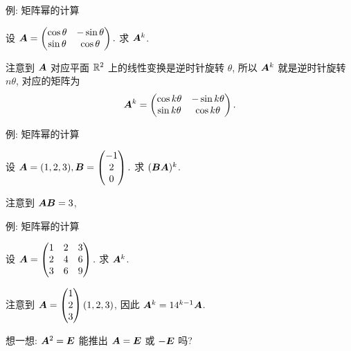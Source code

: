 \begin{frame}{例: 矩阵幂的计算}
	\onslide<+->
	\begin{example}
		设
		${\boldsymbol{A}}=\begin{pmatrix}
			\cos\theta&-\sin\theta\\
			\sin\theta&\cos\theta
		\end{pmatrix}.$
		求 ${\boldsymbol{A}}^k$.
	\end{example}
	\onslide<+->
	\begin{solution}
		注意到 ${\boldsymbol{A}}$ 对应平面 ${\mathbb{R}}^2$ 上的线性变换是逆时针旋转 $\theta$, 所以 ${\boldsymbol{A}}^k$ 就是逆时针旋转 $n\theta$, 对应的矩阵为
		\[{\boldsymbol{A}}^k=\begin{pmatrix}
			\cos k\theta&-\sin k\theta\\
			\sin k\theta&\cos k\theta
		\end{pmatrix}.\]
	\end{solution}
\end{frame}


\begin{frame}{例: 矩阵幂的计算}
	\onslide<+->
	\begin{example}
		设 
		${\boldsymbol{A}}=(1,2,3),{\boldsymbol{B}}=\begin{pmatrix}
			-1\\2\\0
		\end{pmatrix}.$
		求 $({\boldsymbol{B}}{\boldsymbol{A}})^k$.
	\end{example}
	\onslide<+->
	\begin{solution}
		注意到 ${\boldsymbol{A}}{\boldsymbol{B}}=3$,
		\vspace{-\baselineskip}
	\end{solution}
\end{frame}


\begin{frame}{例: 矩阵幂的计算}
	\onslide<+->
	\begin{exercise}
		设 
		${\boldsymbol{A}}=\begin{pmatrix}
			1&2&3\\
			2&4&6\\
			3&6&9
		\end{pmatrix}.$
		求 ${\boldsymbol{A}}^k$.
	\end{exercise}
	\onslide<+->
	\begin{answer}
		注意到 ${\boldsymbol{A}}=\begin{pmatrix}
			1\\2\\3
		\end{pmatrix}(1,2,3)$, 因此 ${\boldsymbol{A}}^k=14^{k-1}{\boldsymbol{A}}$.
	\end{answer}
	\onslide<+->
	想一想: ${\boldsymbol{A}}^2={\boldsymbol{E}}$ 能推出 ${\boldsymbol{A}}={\boldsymbol{E}}$ 或 $-{\boldsymbol{E}}$ 吗?
\end{frame}


